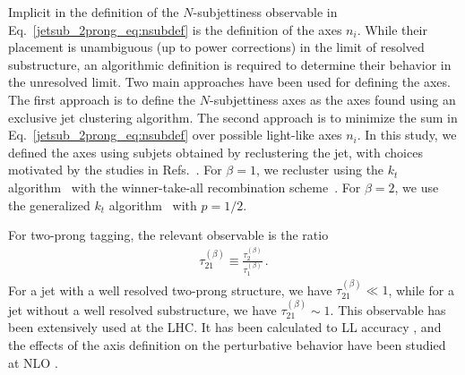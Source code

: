 \documentclass[11pt]{cernrep}
\begin{document}
Implicit in the definition of the $N$-subjettiness observable in
Eq.~\eqref{jetsub_2prong_eq:nsubdef} is the definition of the axes $n_i$.
%
While their
placement is unambiguous (up to power corrections) in the limit of resolved substructure, an algorithmic definition is required to
determine their behavior in the unresolved limit.
%
Two main approaches
have been used for defining the axes.
%
The first approach is to define
the $N$-subjettiness axes as the axes found using an exclusive jet
clustering algorithm. The second approach is to minimize the sum in
Eq.~\eqref{jetsub_2prong_eq:nsubdef} over possible light-like axes $n_i$.
%
In this study, we defined the axes using subjets obtained by reclustering the jet, with choices motivated by the studies in Refs.~\cite{Stewart:2015waa,Dasgupta:2015lxh}.
%
For $\beta = 1$, we recluster using the $k_t$ algorithm~\cite{Catani:1993hr} with the
  winner-take-all recombination scheme~\cite{Larkoski:2014uqa}.
%
For $\beta = 2$, we use the generalized $k_t$ algorithm~\cite{Cacciari:2011ma} with $p=1/2$.

For two-prong tagging, the relevant observable is the ratio \cite{Thaler:2010tr}
\begin{align}
\tau_{21}^{(\beta)}\equiv \frac{\tau_{2}^{(\beta)}}{\tau_{1}^{(\beta)}}\,.
\end{align}
For a jet with a well resolved two-prong structure, we have $\tau_{21}^{(\beta)}\ll 1$, while for a jet without a well resolved substructure, we have $\tau_{21}^{(\beta)}\sim 1$.
%
This observable has been extensively used at the LHC.
%
It has been calculated to LL accuracy \cite{Dasgupta:2015lxh}, and the effects of the axis definition on the perturbative behavior have been studied at NLO \cite{Larkoski:2015uaa}.
\end{document}
